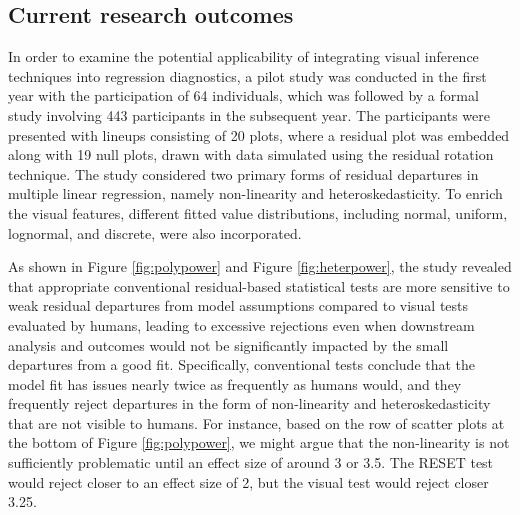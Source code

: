 \documentclass[11pt,a4paper,]{article}
\begin{document}
\hypertarget{current-research-outcomes}{%
\subsection{Current research outcomes}\label{current-research-outcomes}}

In order to examine the potential applicability of integrating visual inference techniques into regression diagnostics, a pilot study was conducted in the first year with the participation of 64 individuals, which was followed by a formal study involving 443 participants in the subsequent year. The participants were presented with lineups consisting of 20 plots, where a residual plot was embedded along with 19 null plots, drawn with data simulated using the residual rotation technique. The study considered two primary forms of residual departures in multiple linear regression, namely non-linearity and heteroskedasticity. To enrich the visual features, different fitted value distributions, including normal, uniform, lognormal, and discrete, were also incorporated.

As shown in Figure \ref{fig:polypower} and Figure \ref{fig:heterpower}, the study revealed that appropriate conventional residual-based statistical tests are more sensitive to weak residual departures from model assumptions compared to visual tests evaluated by humans, leading to excessive rejections even when downstream analysis and outcomes would not be significantly impacted by the small departures from a good fit. Specifically, conventional tests conclude that the model fit has issues nearly twice as frequently as humans would, and they frequently reject departures in the form of non-linearity and heteroskedasticity that are not visible to humans. For instance, based on the row of scatter plots at the bottom of Figure \ref{fig:polypower}, we might argue that the non-linearity is not sufficiently problematic until an effect size of around 3 or 3.5. The RESET test would reject closer to an effect size of 2, but the visual test would reject closer 3.25.
\end{document}
